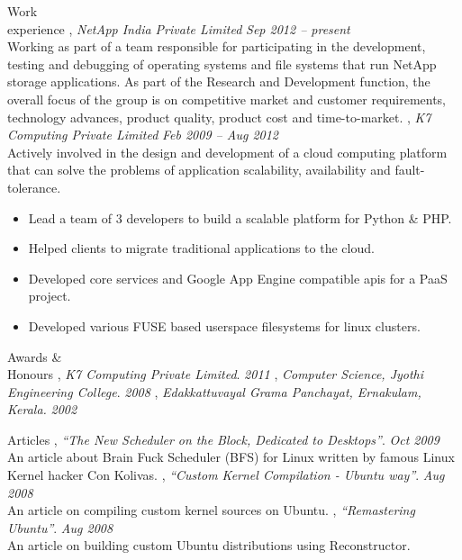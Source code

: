 \documentclass{resume}
\begin{document}
\begin{category}{Work \\experience}
  , {\em NetApp India Private Limited} \hfill {\em Sep 2012 -- present}\\
  Working as part of a team responsible for participating in the development, testing and 
  debugging of operating systems and file systems that run NetApp storage applications. 
  As part of the Research and Development function, the overall focus of the group is on 
  competitive market and customer requirements, technology advances, product quality, 
  product cost and time-to-market.
  , {\em K7 Computing Private Limited} \hfill {\em Feb 2009 -- Aug 2012}\\
  Actively involved in the design and development of a cloud computing platform that can solve 
  the problems of application scalability, availability and fault-tolerance.
  \begin{itemize} 
  \item Lead a team of 3 developers to build a scalable platform for Python \& PHP.
  \item Helped clients to migrate traditional applications to the cloud.
  \item Developed core services and Google App Engine compatible apis for a PaaS project.
  \item Developed various FUSE based userspace filesystems for linux clusters.
  \end{itemize}
\end{category}


\begin{category}{Awards \&\\ Honours}
  , {\em K7 Computing Private Limited}. \hfill {\em 2011}
  , {\em Computer Science, Jyothi Engineering College}. \hfill {\em 2008}
  , {\em Edakkattuvayal Grama Panchayat, Ernakulam, Kerala.} \hfill {\em 2002}
\end{category}


\begin{category}{Articles}
  , {\em ``The New Scheduler on the Block, Dedicated to Desktops''}. \hfill {\em Oct 2009}\\
  An article about Brain Fuck Scheduler (BFS) for Linux written by famous Linux Kernel hacker Con Kolivas.
  , {\em ``Custom Kernel Compilation - Ubuntu way''}. \hfill {\em Aug 2008}\\
  An article on compiling custom kernel sources on Ubuntu.
  , {\em ``Remastering Ubuntu''}. \hfill {\em Aug 2008}\\
  An article on building custom Ubuntu distributions using Reconstructor.
\end{category}
\end{document}
